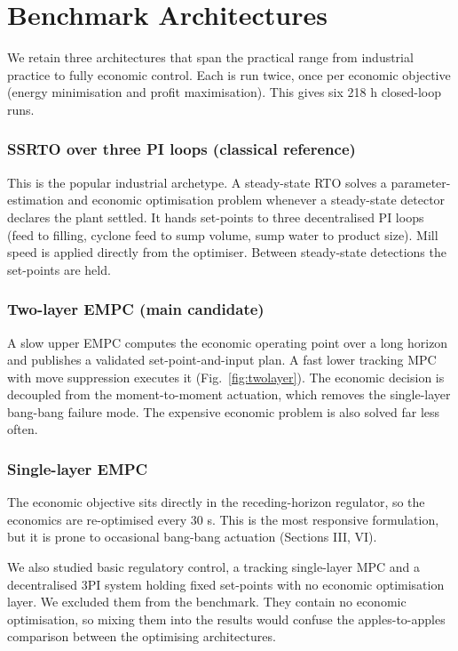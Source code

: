 \documentclass[conference]{IEEEtran}
\begin{document}
\section{Benchmark Architectures}

We retain three architectures that span the practical range from industrial
practice to fully economic control. Each is run twice,
once per economic objective (energy minimisation and profit maximisation).
This gives six 218 h closed-loop runs.

\subsubsection{SSRTO over three PI loops (classical reference)}
This is the popular industrial archetype. A steady-state RTO solves a
parameter-estimation and economic optimisation problem whenever a
steady-state detector declares the plant settled. It hands set-points to
three decentralised PI loops (feed to filling, cyclone feed to sump
volume, sump water to product size). Mill speed is applied directly from
the optimiser. Between steady-state detections the set-points are held.

\subsubsection{Two-layer EMPC (main candidate)}
A slow upper EMPC computes the economic operating point over a long
horizon and publishes a validated set-point-and-input plan. A fast lower
tracking MPC with move suppression executes it (Fig.~\ref{fig:twolayer}).
The economic decision is decoupled from the moment-to-moment actuation,
which removes the single-layer bang-bang failure mode. The expensive
economic problem is also solved far less often.

\subsubsection{Single-layer EMPC}
The economic objective sits directly in the receding-horizon regulator, so
the economics are re-optimised every 30 s. This is the most
responsive formulation, but it is prone to occasional bang-bang
actuation (Sections III, VI).

We also studied basic regulatory control, a tracking single-layer MPC
and a decentralised 3PI system holding fixed set-points with no economic
optimisation layer. We excluded them from the benchmark.
They contain no economic optimisation, so mixing them into the results
would confuse the apples-to-apples comparison between the optimising
architectures.
\end{document}
